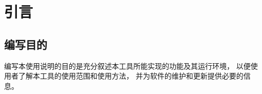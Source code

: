 \section{引言}
    \subsection{编写目的}
        编写本使用说明的目的是充分叙述本工具所能实现的功能及其运行环境，%
        以便使用者了解本工具的使用范围和使用方法，%
        并为软件的维护和更新提供必要的信息。

